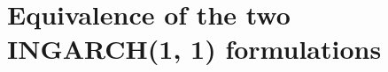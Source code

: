 \documentclass{article}
\begin{document}
%
%
%
%

\appendix
\section{Equivalence of the two INGARCH(1, 1) formulations}
\label{appendix:proof}
\end{document}
